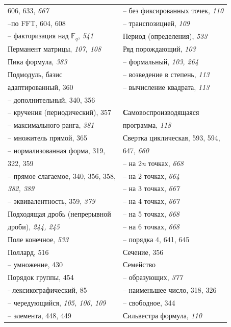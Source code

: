 \documentclass{mai_book}
\begin{document}
{	\newpage
{}
	\begin{tabular}{ll}
			606, 633, \emph{667} & -- без фиксированных точек, \emph{110} \\
			--по FFT, 604, 608 & -- транспозицией, \emph{109} \\
			-- факторизация над $\mathbb{F}_{q}$, \emph{541} & Период (определения), \emph{533} \\
			Перманент матрицы, {\itshape 107, 108} & Ряд порождающий, \emph{103} \\
			Пика формула, \emph{383} & -- формальный, {\itshape 103, 264} \\
			Подмодуль, базис & -- возведение в степень, \emph{113} \\
			адаптированный, 360 & -- вычисление квадрата, \emph{113} \\
			-- дополнительный, 340, 356 & \\
			-- кручения (периодический), 357 & \textbf{С}амовоспроизводящаяся \\
			-- максимального ранга, \emph{381} & программа, \emph{118} \\
			-- множитель прямой, 365 & Свертка циклическая, 593, 594, \\
			-- нормализованная форма, 319, & 647, \emph{660} \\
			322, 359 & -- на 2\emph{n} точках, \emph{668} \\
			-- прямое слагаемое, 340, 356, 358, & -- на 2 точках, \emph{664} \\
			{\itshape 382, 389} & -- на 3 точках, \emph{667} \\
			-- эквивалентность, 359, \emph{379} & -- на 4 точках, \emph{667} \\
			Подходящая дробь (непрерывной & -- на 5 точках, \emph{668} \\
			дроби), {\itshape 244, 245} & -- на 6 точках, \emph{668} \\
			Поле конечное, \emph{533} & -- порядка 4, 641, 645 \\
		Поллард, 516 & Сечение, 356 \\
			-- умножение, 430 & Семейство \\
			Порядок группы, 454 & -- образующих, \emph{377} \\
			- лексикографический, 85 & -- наименьшее число, 318, 326 \\
			-- чередующийся, {\itshape 105, 106, 109} & -- свободное, 344 \\
			-- элемента, 448, 449 & Сильвестра формула, \emph{110} \\

\end{tabular}}
\end{document}
